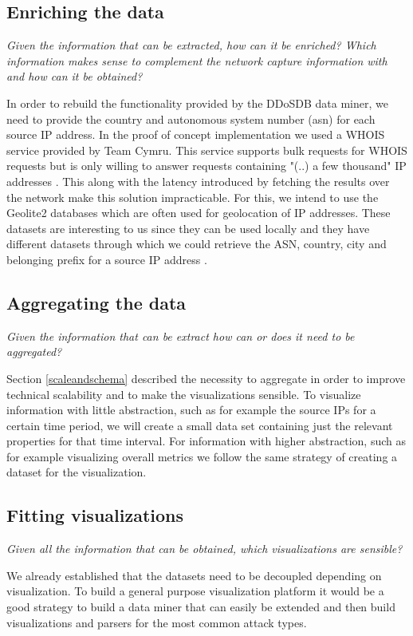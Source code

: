     \subsection{Enriching the data}
\label{enrichingthedata}    \textit{Given the information that can be extracted, how can it be enriched? Which information makes sense to complement the network capture information with and how can it be obtained?}
    
In order to rebuild the functionality provided by the DDoSDB data miner, we need to provide the country and autonomous system number (asn) for each source IP address.
In the proof of concept implementation we used a WHOIS service provided by Team Cymru. This service supports bulk requests for WHOIS requests but is only willing to answer requests containing "(..) a few thousand" IP addresses \cite{teamcymru}. This along with the latency introduced by fetching the results over the network make this solution impracticable. For this, we intend to use the Geolite2 databases which are often used for geolocation of IP addresses. These datasets are interesting to us since they can be used locally and they have different datasets through which we could retrieve the ASN, country, city and belonging prefix for a source IP address \cite{geolite2}.

    
    \subsection{Aggregating the data} 
\textit{Given the information that can be extract how can or does it need to be aggregated?
}    

Section \ref{scaleandschema} described the necessity to aggregate in order to improve technical scalability and to make the visualizations sensible.
To visualize information with little abstraction, such as for example the source IPs for a certain time period, we will create a small data set containing just the relevant properties for that time interval.
For information with higher abstraction, such as for example visualizing overall metrics we follow the same strategy of creating a dataset for the visualization.
    \subsection{Fitting visualizations}
\textit{Given all the information that can be obtained, which visualizations are sensible?
}

We already established that the datasets need to be decoupled depending on visualization. To build a general purpose visualization platform it would be a good strategy to build a data miner that can easily be extended and then build visualizations and parsers for the most common attack types.
